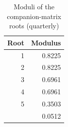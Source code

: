 \begin{table}

\caption{\label{tab:stability}Moduli of the companion-matrix roots (quarterly)}
\centering
\begin{tabular}[t]{rr}
\toprule
Root & Modulus\\
\midrule
1 & 0.8225\\
2 & 0.8225\\
3 & 0.6961\\
4 & 0.6961\\
5 & 0.3503\\
\addlinespace
6 & 0.0512\\
\bottomrule
\end{tabular}
\end{table}
